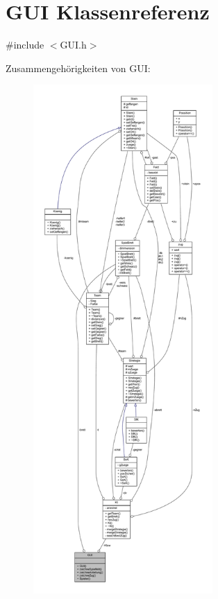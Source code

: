 \hypertarget{class_g_u_i}{}\section{G\+U\+I Klassenreferenz}
\label{class_g_u_i}


{\ttfamily \#include $<$G\+U\+I.\+h$>$}



Zusammengehörigkeiten von G\+U\+I\+:\nopagebreak
\begin{figure}[H]
\begin{center}
\leavevmode
\includegraphics[height=550pt]{class_g_u_i__coll__graph}
\end{center}
\end{figure}
